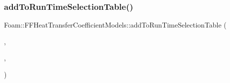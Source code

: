 \mbox{\label{namespaceFoam_1_1FFHeatTransferCoefficientModels_abc6068ca6e6c49772b592f35a0ec243a}} 
\subsubsection{\texorpdfstring{add\+To\+Run\+Time\+Selection\+Table()}{addToRunTimeSelectionTable()}\hspace{0.1cm}{\footnotesize\ttfamily [2/2]}}
{\footnotesize\ttfamily Foam\+::\+F\+F\+Heat\+Transfer\+Coefficient\+Models\+::add\+To\+Run\+Time\+Selection\+Table (\begin{DoxyParamCaption}\item[{\hyperlink{classFoam_1_1FFHeatTransferCoefficientModel}{F\+F\+Heat\+Transfer\+Coefficient\+Model}}]{,  }\item[{\hyperlink{classFoam_1_1FFHeatTransferCoefficientModels_1_1Nusselt}{Nusselt}}]{,  }\item[{F\+F\+Heat\+Transfer\+Coefficient\+Models}]{ }\end{DoxyParamCaption})}


